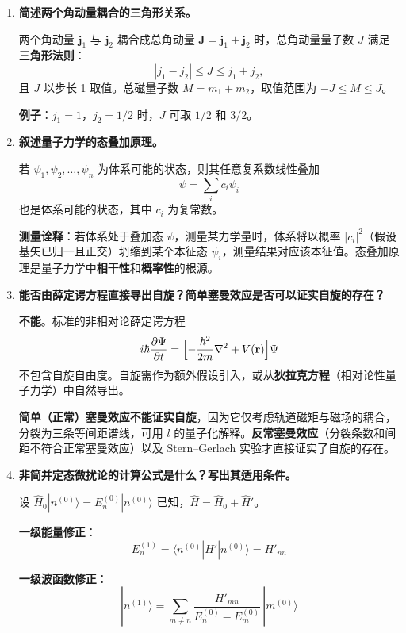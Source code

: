 \begin{enumerate}[label=\textbf{\arabic*.}, leftmargin=2em, itemsep=0.8em, resume]
\item \textbf{简述两个角动量耦合的三角形关系。}

两个角动量 $\mathbf{j}_1$ 与 $\mathbf{j}_2$ 耦合成总角动量 $\mathbf{J} = \mathbf{j}_1 + \mathbf{j}_2$ 时，总角动量量子数 $J$ 满足\textbf{三角形法则}：
\[
    |j_1 - j_2| \le J \le j_1 + j_2,
\]
且 $J$ 以步长 1 取值。总磁量子数 $M = m_1 + m_2$，取值范围为 $-J \le M \le J$。

\textbf{例子}：$j_1=1$，$j_2=1/2$ 时，$J$ 可取 $1/2$ 和 $3/2$。

\item \textbf{叙述量子力学的态叠加原理。}

若 $\psi_1, \psi_2, \dots, \psi_n$ 为体系可能的状态，则其任意复系数线性叠加
\[
    \psi = \sum_i c_i\psi_i
\]
也是体系可能的状态，其中 $c_i$ 为复常数。

\textbf{测量诠释}：若体系处于叠加态 $\psi$，测量某力学量时，体系将以概率 $|c_i|^2$（假设基矢已归一且正交）坍缩到某个本征态 $\psi_i$，测量结果对应该本征值。态叠加原理是量子力学中\textbf{相干性}和\textbf{概率性}的根源。

\item \textbf{能否由薛定谔方程直接导出自旋？简单塞曼效应是否可以证实自旋的存在？}

\textbf{不能}。标准的非相对论薛定谔方程
\[
    i\hbar\frac{\partial\Psi}{\partial t} = \Bigl[-\frac{\hbar^2}{2m}\nabla^2 + V(\mathbf{r})\Bigr]\Psi
\]
不包含自旋自由度。自旋需作为额外假设引入，或从\textbf{狄拉克方程}（相对论性量子力学）中自然导出。

\textbf{简单（正常）塞曼效应不能证实自旋}，因为它仅考虑轨道磁矩与磁场的耦合，分裂为三条等间距谱线，可用 $l$ 的量子化解释。\textbf{反常塞曼效应}（分裂条数和间距不符合正常塞曼效应）以及 Stern--Gerlach 实验才直接证实了自旋的存在。

\item \textbf{非简并定态微扰论的计算公式是什么？写出其适用条件。}

设 $\hat{H}_0|n^{(0)}\rangle = E_n^{(0)}|n^{(0)}\rangle$ 已知，$\hat{H} = \hat{H}_0 + \hat{H}'$。

\textbf{一级能量修正}：
\[
    E_n^{(1)} = \langle n^{(0)}|\hat{H}'|n^{(0)}\rangle = H'_{nn}
\]

\textbf{一级波函数修正}：
\[
    |n^{(1)}\rangle = \sum_{m\neq n} \frac{H'_{mn}}{E_n^{(0)} - E_m^{(0)}}\,|m^{(0)}\rangle
\]


\end{enumerate}
